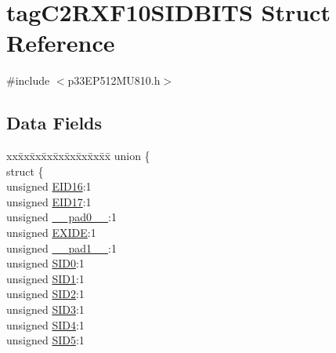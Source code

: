\hypertarget{structtag_c2_r_x_f10_s_i_d_b_i_t_s}{}\section{tag\+C2\+R\+X\+F10\+S\+I\+D\+B\+I\+TS Struct Reference}
\label{structtag_c2_r_x_f10_s_i_d_b_i_t_s}


{\ttfamily \#include $<$p33\+E\+P512\+M\+U810.\+h$>$}

\subsection*{Data Fields}
\begin{DoxyCompactItemize}
\item 
\begin{tabbing}
xx\=xx\=xx\=xx\=xx\=xx\=xx\=xx\=xx\=\kill
union \{\\
\>struct \{\\
\>\>unsigned \hyperlink{structtag_c2_r_x_f10_s_i_d_b_i_t_s_a6dd5663b0c9838c56db040560ca0efa1}{EID16}:1\\
\>\>unsigned \hyperlink{structtag_c2_r_x_f10_s_i_d_b_i_t_s_aa648615464b0eb29967529333eee9fd9}{EID17}:1\\
\>\>unsigned \hyperlink{structtag_c2_r_x_f10_s_i_d_b_i_t_s_adf71f3d8410c1f1dbbc96680a92c49af}{\_\_pad0\_\_}:1\\
\>\>unsigned \hyperlink{structtag_c2_r_x_f10_s_i_d_b_i_t_s_a09ff1c1be3927220bd3dfbc10edfe243}{EXIDE}:1\\
\>\>unsigned \hyperlink{structtag_c2_r_x_f10_s_i_d_b_i_t_s_acaf2d0924a107ec6e8d2e31febaf66f9}{\_\_pad1\_\_}:1\\
\>\>unsigned \hyperlink{structtag_c2_r_x_f10_s_i_d_b_i_t_s_a1ca276ac15df60e1f7b9a6d0011ade93}{SID0}:1\\
\>\>unsigned \hyperlink{structtag_c2_r_x_f10_s_i_d_b_i_t_s_a3405d354f81391f879648f69f504dfc8}{SID1}:1\\
\>\>unsigned \hyperlink{structtag_c2_r_x_f10_s_i_d_b_i_t_s_ad744966dfc49307f731b7045b01b94e5}{SID2}:1\\
\>\>unsigned \hyperlink{structtag_c2_r_x_f10_s_i_d_b_i_t_s_a9345f3e64720be93e83d8dfc827f3f45}{SID3}:1\\
\>\>unsigned \hyperlink{structtag_c2_r_x_f10_s_i_d_b_i_t_s_aefb106fed4bb40e2c3c71ac612c554e3}{SID4}:1\\
\>\>unsigned \hyperlink{structtag_c2_r_x_f10_s_i_d_b_i_t_s_a0f221b3c9612231686bf87ccdcec8489}{SID5}:1\\

\end{tabbing}
\end{DoxyCompactItemize}
